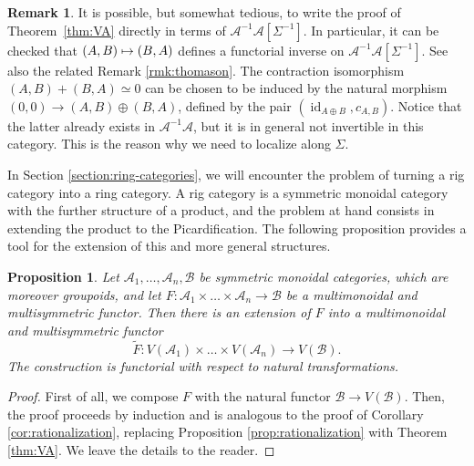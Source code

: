 \documentclass[JEP,XML,SOM,Unicode,published]{cedram}
\newcommand\mto{\mathchoice{\longmapsto}{\mapsto}{\mapsto}{\mapsto}}
\theoremstyle{plain}
\newtheorem{proposition}[theorem]{Proposition}
\theoremstyle{definition}
\newtheorem{remark}[theorem]{Remark}
\newcommand{\Acal}{\mathcal A}
\newcommand{\Bcal}{\mathcal B}
\DeclareMathOperator{\id}{id}
\begin{document}
\begin{remark}\label{rmk:thomason-strict}
It is possible, but somewhat tedious, to write the proof of Theorem~\ref{thm:VA} directly in terms of $\Acal^{-1}\Acal[\Sigma^{-1}]$. In particular, it can be checked that \hbox{$(A,B)\mto (B,A)$} defines a functorial inverse on $\Acal^{-1}\Acal[\Sigma^{-1}]$. See also the related Remark \ref{rmk:thomason}. The contraction isomorphism $(A,B)+(B,A)\simeq 0$ can be chosen to be induced by the natural morphism $(0,0)\to (A,B)\oplus (B,A)$, defined by the pair $(\id_{A\oplus B}, c_{A,B})$. Notice that the latter already exists in $\Acal^{-1}\Acal$, but it is in general not invertible in this category. This is the reason why we need to localize along $\Sigma$.

\end{remark}

In Section \ref{section:ring-categories}, we will encounter the problem of turning a rig category into a ring category. A rig category is a symmetric monoidal category with the further structure of a product, and the problem at hand consists in extending the product to the Picardification. The following proposition provides a tool for the extension of this and more general structures.

\begin{proposition}\label{prop:product}
Let $\Acal_{1},\ldots,\Acal_{n},\Bcal$ be symmetric monoidal categories, which are moreover groupoids, and let $F\colon \Acal_{1}\times\ldots\times\Acal_{n}\to\Bcal$ be a multimonoidal and multisymmetric functor. Then there is an extension of $F$ into a multimonoidal and multisymmetric functor
\begin{displaymath}
\widetilde{F}\colon V(\Acal_{1})\times\ldots \times V(\Acal_{n})\to V(\Bcal).
\end{displaymath}
The construction is functorial with respect to natural transformations.
\end{proposition}
\begin{proof}
First of all, we compose $F$ with the natural functor $\Bcal\to V(\Bcal)$. Then, the proof proceeds by induction and is analogous to the proof of Corollary \ref{cor:rationalization}, replacing Proposition \ref{prop:rationalization} with Theorem \ref{thm:VA}. We leave the details to the reader.
\end{proof}
\end{document}

